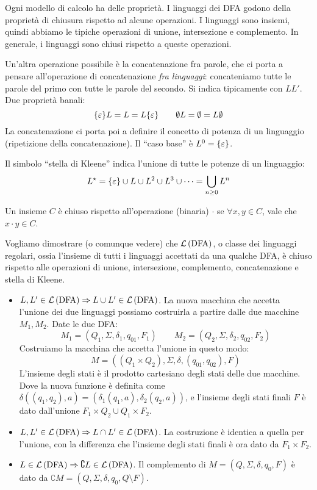 Ogni modello di calcolo ha delle propriet\`a.
I linguaggi dei DFA godono della propriet\`a di chiusura rispetto ad alcune operazioni.
I linguaggi sono insiemi, quindi abbiamo le tipiche operazioni di unione, intersezione e complemento.
In generale, i linguaggi sono chiusi rispetto a queste operazioni.

Un'altra operazione possibile \`e la concatenazione fra parole, che ci porta a pensare all'operazione di concatenazione \emph{fra linguaggi}: concateniamo tutte le parole del primo con tutte le parole del secondo.
Si indica tipicamente con $L L'$.
Due propriet\`a banali:
\[
	\{ \varepsilon \} L = L = L \{ \varepsilon \} \qquad \emptyset L = \emptyset = L \emptyset
\]
La concatenazione ci porta poi a definire il concetto di potenza di un linguaggio (ripetizione della concatenazione).
Il ``caso base'' \`e $L^0 = \{ \varepsilon \}$.

Il simbolo ``stella di Kleene'' indica l'unione di tutte le potenze di un linguaggio:
\[
	L^{\star} = \{ \varepsilon \} \cup L \cup L^2 \cup L^3 \cup \dots = \bigcup_{n \ge 0} L^n
\]

Un insieme $C$ \`e chiuso rispetto all'operazione (binaria) $\cdot$ se $\forall x, y \in C$, vale che $x \cdot y \in C$.

Vogliamo dimostrare (o comunque vedere) che $\mathcal{L}\left( {\text{DFA}} \right)$, o classe dei linguaggi regolari, ossia l'insieme di tutti i linguaggi accettati da una qualche DFA, \`e chiuso rispetto alle operazioni di unione, intersezione, complemento, concatenazione e stella di Kleene.

\begin{itemize}
	\item $L, L' \in \mathcal{L}\left( {\text{DFA}} \right) \Rightarrow L \cup L' \in \mathcal{L}\left( {\text{DFA}} \right)$.
		La nuova macchina che accetta l'unione dei due linguaggi possiamo costruirla a partire dalle due macchine $M_1, M_2$.
		Date le due DFA:
		\[
			M_1 = (Q_1, \Sigma, \delta_1, q_{01}, F_1) \qquad M_2 = (Q_2, \Sigma, \delta_2, q_{02}, F_2)
		\]
		Costruiamo la macchina che accetta l'unione in questo modo:
		\[
			M = \left( (Q_1 \times Q_2), \Sigma, \delta, (q_{01}, q_{02}), F \right)
		\]
		L'insieme degli stati \`e il prodotto cartesiano degli stati delle due macchine.
		Dove la nuova funzione \`e definita come $\delta \left( (q_1, q_2), a \right) = \left( \delta_1(q_1, a), \delta_2(q_2, a) \right)$, e l'insieme degli stati finali $F$ \`e dato dall'unione $F_1 \times Q_2 \cup Q_1 \times F_2$.
	\item $L, L' \in \mathcal{L}\left( {\text{DFA}} \right) \Rightarrow L \cap L' \in \mathcal{L}\left( {\text{DFA}} \right)$.
		La costruzione \`e identica a quella per l'unione, con la differenza che l'insieme degli stati finali \`e ora dato da $F_1 \times F_2$.
	\item $L \in \mathcal{L}\left( {\text{DFA}} \right) \Rightarrow \complement L \in \mathcal{L}\left( {\text{DFA}} \right)$.
		Il complemento di $M = (Q, \Sigma, \delta, q_0, F)$ \`e dato da $\complement M = (Q, \Sigma, \delta, q_0, Q \setminus F)$.
\end{itemize}

